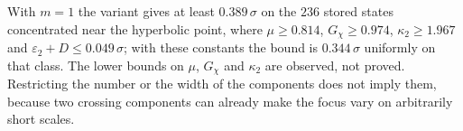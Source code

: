 With $m = 1$ the variant gives at least $0.389\,\sigma$ on the $236$ stored states concentrated near the hyperbolic point, where $\mu \geq 0.814$, $G_\chi \geq 0.974$, $\kappa_2 \geq 1.967$ and $\varepsilon_2 + D \leq 0.049\,\sigma$; with these constants the bound is $0.344\,\sigma$ uniformly on that class. The lower bounds on $\mu$, $G_\chi$ and $\kappa_2$ are observed, not proved. Restricting the number or the width of the components does not imply them, because two crossing components can already make the focus vary on arbitrarily short scales.
